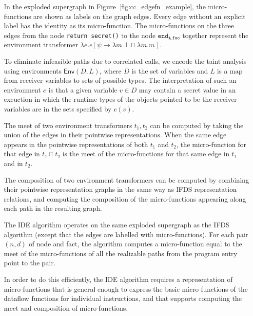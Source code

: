 \begin{example}
    In the exploded supergraph in Figure~\ref{fig:cc_edgefn_example},
    the micro-functions are shown as labels on the graph edges.
    Every edge without an explicit label has the identity as its
    micro-function. The micro-functions on the three edges from
    the node \verb+return secret()+ to the node $\texttt{end}_\texttt{A.foo}$
    together represent the environment transformer 
    $\lambda e.e[\psi \to \lambda m.\bot \sqcap \lambda m.m]$.

    To eliminate infeasible paths due to correlated calls, we encode the taint
    analysis using environments $\textsf{Env}(D,L)$, where $D$ is the set of
    variables and $L$ is a map from receiver variables to sets of possible
    types. The interpretation of such an environment $e$ is that a given variable
    $v \in D$ may contain a secret value in an exeuction in which the runtime
    types of the objects pointed to be the receiver variables are in the sets
    specified by $e(v)$.
\end{example}

The meet of two environment transformers $t_1, t_2$ can be computed by taking the union of the edges
in their pointwise representations. When the same edge appears in the pointwise representations of
both $t_1$ and $t_2$, the micro-function for that edge in $t_1 \sqcap t_2$ is the meet of the
micro-functions for that same edge in $t_1$ and in $t_2$.

The composition of two environment transformers can be computed by combining their pointwise
representation graphs in the same way as IFDS representation relations, and 
computing the composition of the micro-functions appearing along each path in the resulting graph.

The IDE algorithm operates on the same exploded supergraph as the IFDS algorithm
(except that the edges are labelled with micro-functions). For each pair $(n,d)$ of
node and fact, the algorithm computes a micro-function equal to the meet of the micro-functions
of all the realizable paths from the program entry point to the pair.

In order to do this efficiently, the IDE algorithm requires a representation of micro-functions
that is general enough to express the basic micro-functions of the dataflow functions for individual
instructions, and that supports computing the meet and composition of micro-functions.


